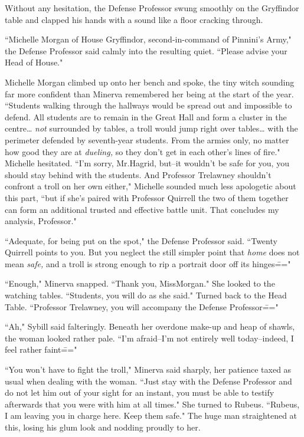 Without any hesitation, the Defense Professor swung smoothly on the Gryffindor table and clapped his hands with a sound like a floor cracking through.

``Michelle Morgan of House Gryffindor, second-in-command of Pinnini's Army," the Defense Professor said calmly into the resulting quiet. ``Please advise your Head of House."

Michelle Morgan climbed up onto her bench and spoke, the tiny witch sounding far more confident than Minerva remembered her being at the start of the year. ``Students walking through the hallways would be spread out and impossible to defend. All students are to remain in the Great Hall and form a cluster in the centre{\ldots} \emph{not} surrounded by tables, a troll would jump right over tables{\ldots} with the perimeter defended by seventh-year students. From the armies only, no matter how good they are at \emph{dueling,} so they don't get in each other's lines of fire." Michelle hesitated. ``I'm sorry, Mr.\?Hagrid, but\---it wouldn't be safe for you, you should stay behind with the students. And Professor Trelawney shouldn't confront a troll on her own either," Michelle sounded much less apologetic about this part, ``but if she's paired with Professor Quirrell the two of them together can form an additional trusted and effective battle unit. That concludes my analysis, Professor."

``Adequate, for being put on the spot," the Defense Professor said. ``Twenty Quirrell points to you. But you neglect the still simpler point that \emph{home} does not mean \emph{safe,} and a troll is strong enough to rip a portrait door off its hinges\==="

``Enough," Minerva snapped. ``Thank you, Miss\?Morgan." She looked to the watching tables. ``Students, you will do as she said." Turned back to the Head Table. ``Professor Trelawney, you will accompany the Defense Professor\==="

``Ah," Sybill said falteringly. Beneath her overdone make-up and heap of shawls, the woman looked rather pale. ``I'm afraid\---I'm not entirely well today\---indeed, I feel rather faint\==="

``You won't have to fight the troll," Minerva said sharply, her patience taxed as usual when dealing with the woman. ``Just stay with the Defense Professor and do not let him out of your sight for an instant, you must be able to testify afterwards that you were with him at all times." She turned to Rubeus. ``Rubeus, I am leaving you in charge here. Keep them safe." The huge man straightened at this, losing his glum look and nodding proudly to her.

